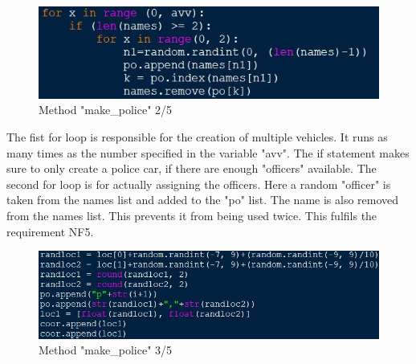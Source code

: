 \begin{figure}[!h]
\center
\includegraphics[scale=0.6]{images/Heiber/a2.JPG}
\caption[caption]{Method "make\_police" 2/5}
\end{figure}
\newline
The fist for loop is responsible for the creation of multiple vehicles. It runs as many times as the number specified in the variable "avv". The if statement makes sure to only create a police car, if there are enough "officers" available. The second for loop is for actually assigning the officers. Here a random "officer" is taken from the names list and added to the "po" list. The name is also removed from the names list. This prevents it from being used twice. This fulfils the requirement NF5.
\newpage
\begin{figure}[!h]
\center
\includegraphics[scale=0.6]{images/Heiber/a3.JPG}
\caption[caption]{Method "make\_police" 3/5}
\end{figure}

